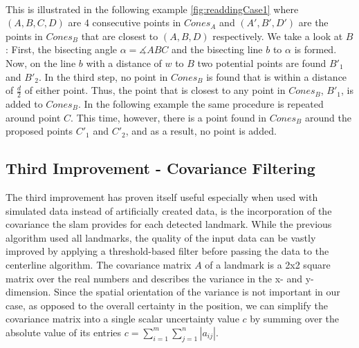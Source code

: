 \\This is illustrated in the following example \ref{fig:readdingCase1} where $(A,B,C,D)$ are 4 consecutive points in $Cones_A$ and $(A',B',D')$ are the points in $Cones_B$ that are closest to $(A,B,D)$ respectively.
We take a look at $B$: First, the bisecting angle $\alpha =\measuredangle  ABC$ and the bisecting line $b$ to $\alpha$ is formed. Now, on the line $b$ with a distance of $w$ to $B$ two potential points are found $B'_1$ and $B'_2$. In the third step, no point in $Cones_B$ is found that is within a distance of $\frac{d}{2}$ of either point. Thus, the point that is closest to any point in $Cones_B$, $B'_1$, is added to $Cones_B$.
In the following example the same procedure is repeated around point $C$.
 This time, however, there is a point found in $Cones_B$ around the proposed points $C'_1$ and $C'_2$, and as a result, no point is added.
\subsection{Third Improvement - Covariance Filtering}
The third improvement has proven itself useful especially when used with simulated data instead of artificially created data, is the incorporation of the covariance the \ac{slam} provides for each detected landmark. While the previous algorithm used all landmarks, the quality of the input data can be vastly improved by applying a threshold-based filter before passing the data to the centerline algorithm. The covariance matrix $A$ of a landmark is a 2x2 square matrix over the real numbers and describes the variance in the x- and y-dimension. Since the spatial orientation of the variance is not important in our case, as opposed to the overall certainty in the position, we can simplify the covariance matrix into a single scalar uncertainty value $c$ by summing over the absolute value of its entries $c = \sum_{i=1}^m \sum_{j=1}^n |a_{ij}|$.

